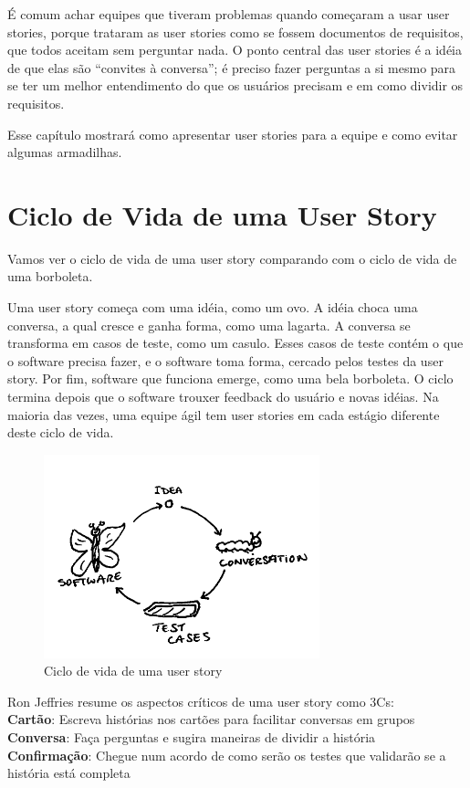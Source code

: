 \documentclass[a4paper, 10pt, font=plain]{abnt}
\begin{document}
É comum achar equipes que tiveram problemas quando começaram a usar user stories, porque trataram as user stories como se fossem documentos de requisitos, que todos aceitam sem perguntar nada. O ponto central das user stories é a idéia de que elas são ``convites à conversa''; é preciso fazer perguntas a si mesmo para se ter um melhor entendimento do que os usuários precisam e em como dividir os requisitos.

Esse capítulo mostrará como apresentar user stories para a equipe e como evitar algumas armadilhas.


\section{Ciclo de Vida de uma User Story}
Vamos ver o ciclo de vida de uma user story comparando com o ciclo de vida de uma borboleta.

Uma user story começa com uma idéia, como um ovo. A idéia choca uma conversa, a qual cresce e ganha forma, como uma lagarta. A conversa se transforma em casos de teste, como um casulo. Esses casos de teste contém o que o software precisa fazer, e o software toma forma, cercado pelos testes da user story. Por fim, software que funciona emerge, como uma bela borboleta. O ciclo termina depois que o software trouxer feedback do usuário e novas idéias. Na maioria das vezes, uma equipe ágil tem user stories em cada estágio diferente deste ciclo de vida.

\begin{figure}[h]
  \centering
  \includegraphics[width=8cm]{user_story_life_cycle}
  \caption{Ciclo de vida de uma user story}
\end{figure}

Ron Jeffries resume os aspectos críticos de uma user story como 3Cs:\\
\textbf{Cartão}: Escreva histórias nos cartões para facilitar conversas em grupos\\
\textbf{Conversa}: Faça perguntas e sugira maneiras de dividir a história\\
\textbf{Confirmação}: Chegue num acordo de como serão os testes que validarão se a história está completa\\
\end{document}
